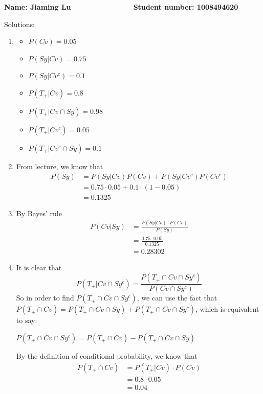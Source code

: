\documentclass[a4paper, 12pt]{article}
\begin{document}
\textbf{Name: Jiaming Lu $~~~~~~~~~~~~~~~~~~~~~~~~~
~~~~~~~~~~~$ Student number: 1008494620}

Solutions:

\begin{enumerate}
\begin{enumerate}
\item 
\begin{itemize}
	\item $P(Cv) = 0.05$
	\item $P(Sy|Cv) = 0.75$
	\item $P(Sy|Cv^c) = 0.1$
	\item $P(T_+|Cv) = 0.8$
	\item $P(T_+|Cv\cap Sy) = 0.98$
	\item $P(T_+|Cv^c) = 0.05$
	\item $P(T_+|Cv^c\cap Sy) = 0.1$
\end{itemize}
	
\item From lecture, we know that
	$$\begin{aligned}
		P(Sy) 
			&= P(Sy|Cv)P(Cv) + P(Sy|Cv^c)P(Cv^c)\\
			&= 0.75 \cdot 0.05 + 0.1 \cdot(1-0.05)\\
			&= 0.1325
	\end{aligned}$$

\item By Bayes' rule
	$$\begin{aligned}
		P(Cv|Sy) 
		&= \frac{P(Sy|Cv)\cdot P(Cv)}{P(Sy)}\\
		&= \frac{0.75\cdot 0.05}{0.1325}\\
		&= 0.28302
		\end{aligned}$$

	\item It is clear that 
		$$P(T_+|Cv\cap Sy^c) = \frac{P(T_+\cap Cv\cap Sy^c)}{P(Cv\cap Sy^c)}$$
		So in order to find $P(T_+\cap Cv\cap Sy^c)$, we can use the fact that 
		$P(T_+\cap Cv) = P(T_+\cap Cv\cap Sy) + P(T_+ \cap Cv\cap Sy^c)$, which 
		is equivalent to say: 

		$P(T_+ \cap Cv\cap Sy^c)=P(T_+\cap Cv)-P(T_+\cap Cv\cap Sy)$

		By the definition of conditional probability, we know that
		$$\begin{aligned}
			P(T_+\cap Cv)
			&= P(T_+|Cv)\cdot P(Cv)\\
			&= 0.8\cdot 0.05\\
			&= 0.04
		\end{aligned}$$
		

\end{enumerate}
\end{enumerate}
\end{document}
